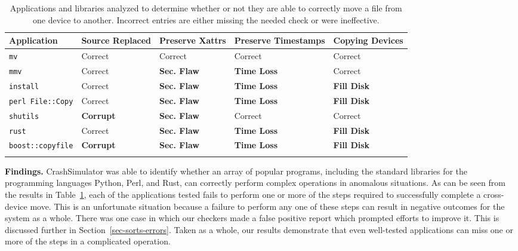  \begin{table}[t]
    \scriptsize{}
    \begin{tabular}{l p{1cm} p{1cm} p{1.2cm} p{1cm}}
    \toprule{}
        Application     & Source Replaced & Preserve Xattrs & Preserve Timestamps & Copying Devices\\
\hline
        {\tt mv}              & Correct             & Correct         & Correct             & Correct\\
        {\tt mmv}             & Correct             & {\bf Sec. Flaw} & {\bf Time Loss} & Correct\\
        {\tt install}         & Correct             & {\bf Sec. Flaw} & {\bf Time Loss} & {\bf Fill Disk} \\
        {\tt perl File::Copy} & Correct             & {\bf Sec. Flaw} & {\bf Time Loss} & {\bf Fill Disk} \\
        {\tt shutils}         & {\bf Corrupt}	& {\bf Sec. Flaw} 	& Correct             & Correct\\
        {\tt rust}             & Correct             & {\bf Sec. Flaw} & {\bf Time Loss} & {\bf Fill Disk} \\
        {\tt boost::copyfile} & {\bf Corrupt}	      & {\bf Sec. Flaw} & {\bf Time Loss} & {\bf Fill Disk} \\
    \bottomrule{}
    \end{tabular}
    \caption{Applications and libraries analyzed to determine whether or not
      they are able to correctly move a file from one device to another.
Incorrect entries are either missing the needed check or were ineffective.}
    \label{table:crossdevice}
\end{table}

{\bf Findings.}
CrashSimulator was able to identify whether an array of popular programs,
including the standard libraries for the programming languages Python,
Perl,
and Rust,
can correctly perform complex
operations in anomalous situations.
As can be seen from the results in Table~\ref{table:crossdevice}, each of the
applications tested fails to perform one or more of the steps required to
successfully complete a cross-device move.  This is an unfortunate situation
because a failure to perform any one of these steps can result in negative
outcomes for the system as a whole.  There was one case in which our
checkers made a false positive report which prompted efforts to improve it.
This is discussed further in
Section~\ref{sec-sorts-errors}.
Taken as a whole, our results demonstrate that even well-tested applications
can miss one or more of the steps in a complicated operation.

